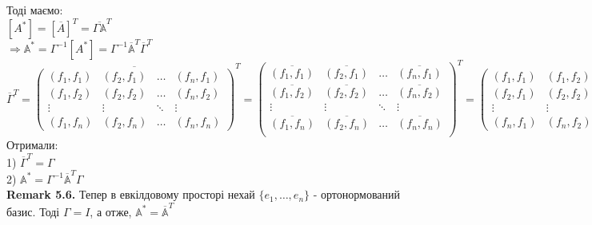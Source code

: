 \documentclass[a4paper, 14pt]{extarticle}
\def\rm#1{\textbf{Remark {#1}}}
\def\bigline{\vspace{5mm}\\}
\begin{document}
Тоді маємо:\\
$[A^*] = [\overline{A}]^T = \overline{\Gamma \mathbb{A}}^T$\\
$\Rightarrow \mathbb{A}^* = \Gamma^{-1} [A^*] = \Gamma^{-1} \overline{\mathbb{A}}^T \overline{\Gamma}^T$\\
$\overline{\Gamma}^T = \overline{\begin{pmatrix}
(f_1,f_1) & (f_2,f_1) & \dots & (f_n,f_1) \\
(f_1,f_2) & (f_2,f_2) & \dots & (f_n,f_2) \\
\vdots & \vdots & \ddots & \vdots \\
(f_1,f_n) & (f_2,f_n) & \dots & (f_n,f_n)
\end{pmatrix}}^T = \begin{pmatrix}
\overline{(f_1,f_1)} & \overline{(f_2,f_1)} & \dots & \overline{(f_n,f_1)} \\
\overline{(f_1,f_2)} & \overline{(f_2,f_2)} & \dots & \overline{(f_n,f_2)} \\
\vdots & \vdots & \ddots & \vdots \\
\overline{(f_1,f_n)} & \overline{(f_2,f_n)} & \dots & \overline{(f_n,f_n)} \\
\end{pmatrix}^T = \begin{pmatrix}
(f_1,f_1) & (f_1,f_2) & \dots & (f_1,f_n) \\
(f_2,f_1) & (f_2,f_2) & \dots & (f_2,f_n) \\
\vdots & \vdots & \ddots & \vdots \\
(f_n,f_1) & (f_n,f_2) & \dots & (f_n,f_n)
\end{pmatrix}^T = \Gamma$\\
Отримали:\\
1) $\overline{\Gamma}^T = \Gamma$\\
2) $\mathbb{A^*} = \Gamma^{-1} \mathbb{\overline{A}}^T \Gamma$
\bigline
\rm{5.6.} Тепер в евкілдовому просторі нехай $\{e_1,\dots,e_n\}$ - ортонормований базис. Тоді $\Gamma = I$, а отже, $\mathbb{A^*} = \mathbb{\overline{A}}^T$\\
\end{document}
